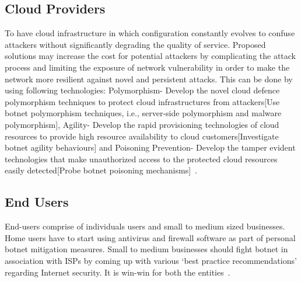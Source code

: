 \subsection{Cloud Providers}

To have cloud infrastructure in which configuration constantly evolves to confuse attackers without significantly degrading the quality of service. Proposed solutions may increase the cost for potential attackers by complicating the attack process and limiting the exposure of network vulnerability in order to make the network more resilient against novel and persistent attacks. This can be done by using following technologies: Polymorphism- Develop the novel cloud defence polymorphism techniques to protect cloud infrastructures from attackers[Use botnet polymorphism techniques, i.e., server-side polymorphism and malware polymorphism], Agility- Develop the rapid provisioning technologies of cloud resources to provide high resource availability to cloud customers[Investigate botnet agility behaviours] and Poisoning Prevention- Develop the tamper evident technologies that make unauthorized access to the protected cloud resources easily detected[Probe botnet poisoning mechanisms]~\cite{peng2014moving}.

\subsection{End Users}

End-users comprise of individuals users and small to medium sized businesses. Home users have to start using antivirus and firewall software as part of personal botnet mitigation measures. Small to medium businesses should fight botnet in association with ISPs by coming up with various ‘best practice recommendations’ regarding Internet security. It is win-win for both the entities~\cite{asghari2010botnet}.


